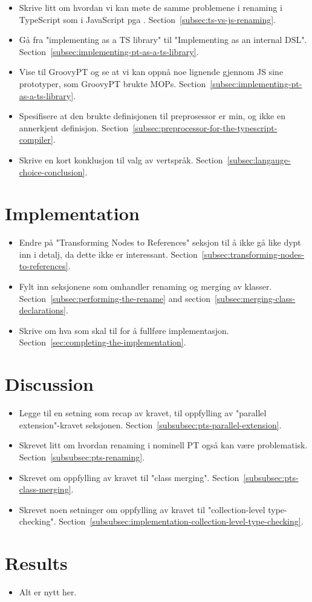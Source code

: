 \begin{itemize}
    \item Skrive litt om hvordan vi kan møte de samme problemene i renaming i TypeScript som i JavaScript pga .
    Section~\vref{subsec:ts-vs-js-renaming}.
    \item Gå fra "implementing as a TS library" til "Implementing as an internal DSL".
    Section~\vref{subsec:implementing-pt-as-a-ts-library}.
    \item Vise til GroovyPT og se at vi kan oppnå noe lignende gjennom JS sine prototyper, som GroovyPT brukte MOPs.
    Section~\vref{subsec:implementing-pt-as-a-ts-library}.
    \item Spesifisere at den brukte definisjonen til preprosessor er min, og ikke en annerkjent definisjon.
    Section~\vref{subsec:preprocessor-for-the-typescript-compiler}.
    \item Skrive en kort konklusjon til valg av vertspråk.
    Section~\vref{subsec:langauge-choice-conclusion}.
\end{itemize}

\section*{Implementation}

\begin{itemize}
    \item Endre på "Transforming Nodes to References" seksjon til å ikke gå like dypt inn i detalj, da dette ikke er interessant.
    Section~\vref{subsec:transforming-nodes-to-references}.
    \item Fylt inn seksjonene som omhandler renaming og merging av klasser.
    Section~\vref{subsec:performing-the-rename} and section~\vref{subsec:merging-class-declarations}.
    \item Skrive om hva som skal til for å fullføre implementasjon.
    Section~\vref{sec:completing-the-implementation}.
\end{itemize}

\section*{Discussion}

\begin{itemize}
    \item Legge til en setning som recap av kravet, til oppfylling av "parallel extension"-kravet seksjonen.
    Section~\vref{subsubsec:pts-parallel-extension}.
    \item Skrevet litt om hvordan renaming i nominell PT også kan være problematisk.
    Section~\vref{subsubsec:pts-renaming}.
    \item Skrevet om oppfylling av kravet til "class merging".
    Section~\vref{subsubsec:pts-class-merging}.
    \item Skrevet noen setninger om oppfylling av kravet til "collection-level type-checking".
    Section~\vref{subsubsec:implementation-collection-level-type-checking}.
\end{itemize}

\section*{Results}

\begin{itemize}
    \item Alt er nytt her.
\end{itemize}
